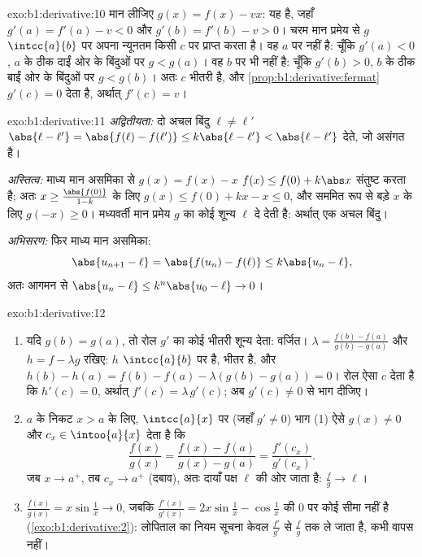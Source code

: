 \begin{solution}{exo:b1:derivative:10}
मान लीजिए $g(x) = f(x) - vx$: यह  है, जहाँ $g'(a) = f'(a) - v < 0$ और
$g'(b) = f'(b) - v > 0$। चरम मान प्रमेय से $g$ $\intcc{a}{b}$ पर अपना
न्यूनतम किसी $c$ पर प्राप्त करता है। वह $a$ पर नहीं है: चूँकि $g'(a) < 0$,
$a$ के ठीक दाईं ओर के बिंदुओं पर $g < g(a)$। वह $b$ पर भी नहीं है: चूँकि
$g'(b) > 0$, $b$ के ठीक बाईं ओर के बिंदुओं पर $g < g(b)$। अतः $c$ भीतरी है,
और \cref{prop:b1:derivative:fermat} $g'(c) = 0$ देता है, अर्थात् $f'(c) =
v$।
\end{solution}

\begin{solution}{exo:b1:derivative:11}
\emph{अद्वितीयता:} दो अचल बिंदु $\ell \neq \ell'$ $\abs{\ell - \ell'} =
\abs{f(\ell) - f(\ell')} \leq k\abs{\ell - \ell'} < \abs{\ell - \ell'}$
देते, जो असंगत है।

\emph{अस्तित्व:} माध्य मान असमिका से $g(x) = f(x) - x$ $f(x) \leq f(0) +
k\abs x$ संतुष्ट करता है; अतः $x \geq \frac{\abs{f(0)}}{1 - k}$ के लिए $g(x)
\leq f(0) + kx - x \leq 0$, और सममित रूप से बड़े $x$ के लिए $g(-x) \geq 0$।
मध्यवर्ती मान प्रमेय $g$ का कोई शून्य $\ell$ दे देती है: अर्थात् एक अचल
बिंदु।

\emph{अभिसरण:} फिर माध्य मान असमिका:
\[
\abs{u_{n+1} - \ell} = \abs{f(u_n) - f(\ell)} \leq k\abs{u_n - \ell},
\]
अतः आगमन से $\abs{u_n - \ell} \leq k^n \abs{u_0 - \ell} \to 0$।
\end{solution}

\begin{solution}{exo:b1:derivative:12}
\begin{enumerate}
  \item यदि $g(b) = g(a)$, तो रोल $g'$ का कोई भीतरी शून्य देता: वर्जित।
  $\lambda = \frac{f(b) - f(a)}{g(b) - g(a)}$ और $h = f - \lambda g$ रखिए:
  $h$ $\intcc{a}{b}$ पर  है, भीतर  है, और $h(b) - h(a) = f(b) -
  f(a) - \lambda(g(b) - g(a)) = 0$। रोल ऐसा $c$ देता है कि $h'(c) = 0$,
  अर्थात् $f'(c) = \lambda\,g'(c)$; अब $g'(c) \neq 0$ से भाग दीजिए।
  \item $a$ के निकट $x > a$ के लिए, $\intcc{a}{x}$ पर (जहाँ $g' \neq 0$) भाग
  (1) ऐसे $g(x) \neq 0$ और $c_x \in \intoo{a}{x}$ देता है कि
        \[
        \frac{f(x)}{g(x)} = \frac{f(x) - f(a)}{g(x) - g(a)}
        = \frac{f'(c_x)}{g'(c_x)} .
        \]
        जब $x \to a^+$, तब $c_x \to a^+$ (दबाव), अतः दायाँ पक्ष $\ell$ की ओर
        जाता है: $\frac{f}{g} \to \ell$।
  \item $\frac{f(x)}{g(x)} = x\sin\frac1x \to 0$, जबकि $\frac{f'(x)}{g'(x)}
  = 2x\sin\frac1x - \cos\frac1x$ की $0$ पर कोई सीमा नहीं है
  (\cref{exo:b1:derivative:2}): लोपिताल का नियम सूचना केवल $\frac{f'}{g'}$
  से $\frac fg$ तक ले जाता है, कभी वापस नहीं।
\end{enumerate}
\end{solution}

